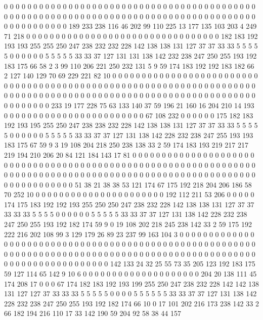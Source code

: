 0 0 0 0 0 0 0 0 0 0 0 0 0 0 0 0 0 0 0 0
0 0 0 0 0 0 0 0 0 0 0 0 0 0 0 0 0 0 0 0
0 0 0 0 0 0 0 0 0 0 0 0 0 0 0 0 0 0 0 0
0 0 0 0 0 0 0 0 0 0 0 0 0 0 0 0 0 0 0 0
0 0 0 0 0 0 0 0 0 0 0 0 0 0 0 0 0 189 233 238
116 46 202 99 110 225 13 177 135 103 203 4 249 71 218 0 0 0 0 0
0 0 0 0 0 0 0 0 0 0 0 0 0 0 0 0 0 0 0 0
0 0 0 0 0 0 0 0 182 183 192 193 193 255 255 250 247 238 232 232
228 142 138 138 131 127 37 37 33 33 5 5 5 5 5 0 0 0 0 0
0 5 5 5 5 5 33 33 37 127 131 131 138 142 232 238 247 250 255 193
192 183 175 66 58 2 3 99 110 206 221 250 232 131 5 9 59 174 183 192
192 183 182 66 2 127 140 129 70 69 229 221 82 10 0 0 0 0 0 0
0 0 0 0 0 0 0 0 0 0 0 0 0 0 0 0 0 0 0 0
0 0 0 0 0 0 0 0 0 0 0 0 0 0 0 0 0 0 0 0
0 0 0 0 0 0 0 0 0 0 0 0 0 0 0 0 0 0 0 0
0 0 0 0 0 0 0 0 0 0 0 0 0 0 0 0 0 0 0 0
0 0 0 0 0 0 0 0 0 0 0 0 0 0 0 0 0 0 0 0
0 0 0 0 0 0 0 0 0 0 0 0 0 233 19 177 228 75 63 133
140 37 59 196 21 160 16 204 210 14 193 0 0 0 0 0 0 0 0 0
0 0 0 0 0 0 0 0 0 0 0 0 0 0 0 67 108 232 0 0
0 0 0 0 175 182 183 192 193 195 255 250 247 238 238 232 228 142 138 138
131 127 37 37 33 33 5 5 5 5 5 0 0 0 0 0 0 5 5 5
5 5 33 33 37 37 127 131 138 142 228 232 238 247 255 193 193 183 175 67
59 9 3 19 108 204 218 250 238 138 33 2 59 174 183 193 219 217 217 219
194 210 206 20 84 121 184 143 17 81 0 0 0 0 0 0 0 0 0 0
0 0 0 0 0 0 0 0 0 0 0 0 0 0 0 0 0 0 0 0
0 0 0 0 0 0 0 0 0 0 0 0 0 0 0 0 0 0 0 0
0 0 0 0 0 0 0 0 0 0 0 0 0 0 0 0 0 0 0 0
0 0 0 0 0 0 0 0 0 0 0 0 0 0 0 0 0 0 0 0
0 0 0 0 0 0 0 0 0 0 0 0 0 0 0 0 0 0 0 0
0 0 0 0 0 0 0 0 0 51 38 21 38 38 53 121 174 67 175 192
218 204 206 186 58 70 252 10 0 0 0 0 0 0 0 0 0 0 0 0
0 0 0 0 0 0 0 0 0 0 192 112 211 53 206 0 0 0 0 0
174 175 183 192 192 193 255 250 250 247 238 232 228 142 138 138 131 127 37 37
33 33 33 5 5 5 5 0 0 0 0 0 0 5 5 5 5 5 33 33
37 37 127 131 138 142 228 232 238 247 250 255 193 192 182 174 59 9 0 19
108 202 218 245 238 142 33 2 59 175 192 222 216 202 108 99 3 129 179 26
89 23 237 99 163 104 3 0 0 0 0 0 0 0 0 0 0 0 0 0
0 0 0 0 0 0 0 0 0 0 0 0 0 0 0 0 0 0 0 0
0 0 0 0 0 0 0 0 0 0 0 0 0 0 0 0 0 0 0 0
0 0 0 0 0 0 0 0 0 0 0 0 0 0 0 0 0 0 0 0
0 0 0 0 0 0 0 0 0 0 0 0 0 0 0 0 0 0 0 0
0 0 0 0 0 0 0 0 0 0 0 0 0 0 0 0 0 0 0 0
0 0 0 0 142 133 24 32 25 55 73 35 205 123 192 183 175 59 127 114
65 142 9 10 6 0 0 0 0 0 0 0 0 0 0 0 0 0 0 0
0 0 0 0 0 204 20 138 111 45 174 208 17 0 0 0 67 174 182 183
192 193 199 255 250 247 238 232 228 142 142 138 131 127 127 37 33 33 33 5
5 5 5 5 0 0 0 0 5 5 5 5 5 5 33 33 37 37 127 131
138 142 228 232 238 247 250 255 193 192 182 174 66 10 0 17 101 202 216 173
238 142 33 2 66 182 194 216 110 17 33 142 190 59 204 92 58 38 44 157
